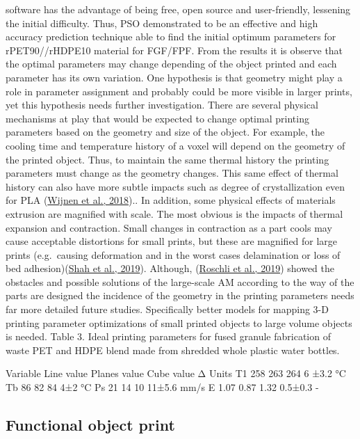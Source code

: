 \documentclass[
  12pt,
  number,
  review]{elsarticle}
\begin{document}
software has the advantage of being free, open source and user-friendly,
lessening the initial difficulty. Thus, PSO demonstrated to be an
effective and high accuracy prediction technique able to find the
initial optimum parameters for rPET90//rHDPE10 material for FGF/FPF.
From the results it is observe that the optimal parameters may change
depending of the object printed and each parameter has its own
variation. One hypothesis is that geometry might play a role in
parameter assignment and probably could be more visible in larger
prints, yet this hypothesis needs further investigation. There are
several physical mechanisms at play that would be expected to change
optimal printing parameters based on the geometry and size of the
object. For example, the cooling time and temperature history of a voxel
will depend on the geometry of the printed object. Thus, to maintain the
same thermal history the printing parameters must change as the geometry
changes. This same effect of thermal history can also have more subtle
impacts such as degree of crystallization even for PLA
(\protect\hyperlink{ref-wijnen2018}{Wijnen et al., 2018}).. In addition,
some physical effects of materials extrusion are magnified with scale.
The most obvious is the impacts of thermal expansion and contraction.
Small changes in contraction as a part cools may cause acceptable
distortions for small prints, but these are magnified for large prints
(e.g.~causing deformation and in the worst cases delamination or loss of
bed adhesion)(\protect\hyperlink{ref-shah2019}{Shah et al., 2019}).
Although, (\protect\hyperlink{ref-roschli2019}{Roschli et al., 2019})
showed the obstacles and possible solutions of the large-scale AM
according to the way of the parts are designed the incidence of the
geometry in the printing parameters needs far more detailed future
studies. Specifically better models for mapping 3-D printing parameter
optimizations of small printed objects to large volume objects is
needed. Table 3. Ideal printing parameters for fused granule fabrication
of waste PET and HDPE blend made from shredded whole plastic water
bottles.

Variable Line value Planes value Cube value Δ Units T1 258 263 264 6
±3.2 °C Tb 86 82 84 4±2 °C Ps 21 14 10 11±5.6 mm/s E 1.07 0.87 1.32
0.5±0.3 -

\hypertarget{functional-object-print}{%
\subsection{Functional object print}\label{functional-object-print}}
\end{document}
